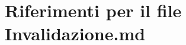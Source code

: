 \hypertarget{Invalidazione_8md}{\section{Riferimenti per il file Invalidazione.\+md}
\label{Invalidazione_8md}
}
